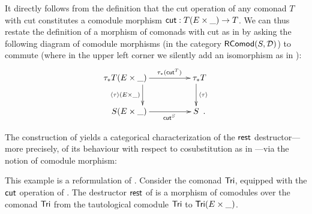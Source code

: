 \documentclass[envcountsame]{llncs}
\begin{document}
\begin{Long}

It directly follows from the definition that the cut operation of any comonad $T$ with cut 
constitutes a comodule morphism $\mathsf{cut} : T(E\times \_) \to T$.
We can thus restate the definition of a morphism of comonads with cut as in  by asking the following diagram 
of comodule morphisms (in the category $\mathsf{RComod}(S,\mathcal{D})$) to commute
(where in the upper left corner we silently add an isomorphism as in ):
 \[ \begin{xy}
       \xymatrix{  **[l] \tau_*T(E\times \_ )  \ar[r]^{\tau_*(\cut^T)} \ar[d]_{\induced{\tau}(E\times \_)}  &  **[r] \tau_*T \ar[d]^{\induced{\tau}} \\
                   **[l]  S (E\times \_ ) \ar[r]_{\cut^S}  &  **[r] S  \enspace .
        }
      \end{xy}
   \]

\end{Long}



\begin{Long}
The construction of  yields a categorical characterization of the $\mathsf{rest}$ destructor---%
more precisely, of its behaviour with respect to cosubstitution as in ---via the notion of comodule morphism:

\begin{example}\label{ex:tail_comodule_alternative}
This example is a reformulation of .
 Consider the comonad $\mathsf{Tri}$, equipped with the $\mathsf{cut}$ operation of .
 The destructor $\mathsf{rest}$ of  is a morphism of comodules over the comonad $\mathsf{Tri}$ 
  from the tautological comodule  $\mathsf{Tri}$ to $\mathsf{Tri}(E\times \_)$.
  
\end{example}
\end{Long}
\end{document}
